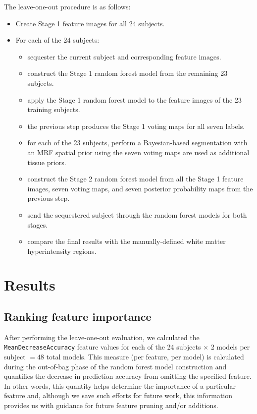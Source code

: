 \documentclass[11pt,]{article}
\providecommand{\tightlist}{%
  \setlength{\itemsep}{0pt}\setlength{\parskip}{0pt}}
\begin{document}
The leave-one-out procedure is as follows:

\begin{itemize}
\tightlist
\item
  Create Stage 1 feature images for all 24 subjects.
\item
  For each of the 24 subjects:

  \begin{itemize}
  \tightlist
  \item
    sequester the current subject and corresponding feature images.
  \item
    construct the Stage 1 random forest model from the remaining 23
    subjects.
  \item
    apply the Stage 1 random forest model to the feature images of the
    23 training subjects.
  \item
    the previous step produces the Stage 1 voting maps for all seven
    labels.
  \item
    for each of the 23 subjects, perform a Bayesian-based segmentation
    with an MRF spatial prior using the seven voting maps are used as
    additional tissue priors.
  \item
    construct the Stage 2 random forest model from all the Stage 1
    feature images, seven voting maps, and seven posterior probability
    maps from the previous step.
  \item
    send the sequestered subject through the random forest models for
    both stages.
  \item
    compare the final results with the manually-defined white matter
    hyperintensity regions.
  \end{itemize}
\end{itemize}

\section{Results}\label{results}

\subsection{Ranking feature
importance}\label{ranking-feature-importance}

After performing the leave-one-out
evaluation,
we calculated the \texttt{MeanDecreaseAccuracy} feature values for each
of the 24 subjects \(\times\) 2 models per subject \(=48\) total models.
This measure (per feature, per model) is calculated during the
out-of-bag phase of the random forest model construction and quantifies
the decrease in prediction accuracy from omitting the specified feature.
In other words, this quantity helps determine the importance of a
particular feature and, although we save such efforts for future work,
this information provides us with guidance for future feature pruning
and/or additions.
\end{document}
